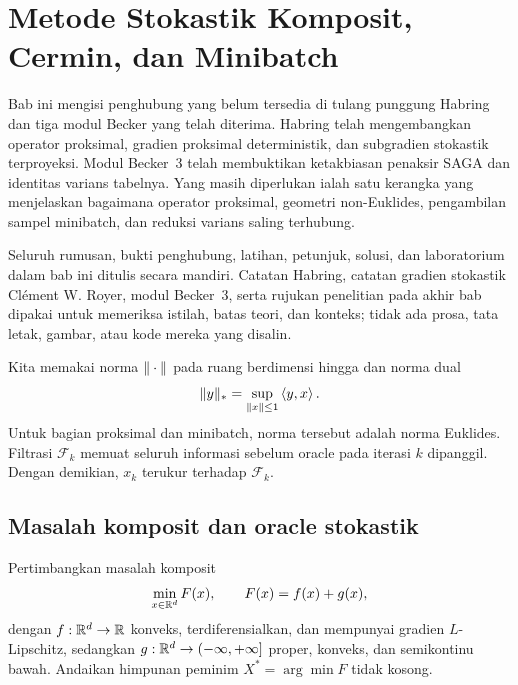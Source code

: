 \chapter{Metode Stokastik Komposit, Cermin, dan Minibatch}
\label{orig01:chapter:stochastic-composite}

Bab ini mengisi penghubung yang belum tersedia di tulang punggung Habring
dan tiga modul Becker yang telah diterima. Habring telah mengembangkan
operator proksimal, gradien proksimal deterministik, dan subgradien stokastik
terproyeksi. Modul Becker~3 telah membuktikan ketakbiasan penaksir SAGA dan
identitas varians tabelnya. Yang masih diperlukan ialah satu kerangka yang
menjelaskan bagaimana operator proksimal, geometri non-Euklides, pengambilan
sampel minibatch, dan reduksi varians saling terhubung.

Seluruh rumusan, bukti penghubung, latihan, petunjuk, solusi, dan laboratorium
dalam bab ini ditulis secara mandiri. Catatan Habring, catatan gradien
stokastik Cl\'ement W. Royer, modul Becker~3, serta rujukan penelitian pada
akhir bab dipakai untuk memeriksa istilah, batas teori, dan konteks; tidak ada
prosa, tata letak, gambar, atau kode mereka yang disalin.

Kita memakai norma $\|\cdot\|$ pada ruang berdimensi hingga dan norma
dual
\begin{equation}
  \|y\|_*=\sup_{\|x\|\leq1}\left\langle y , x\right\rangle.
\end{equation}
Untuk bagian proksimal dan minibatch, norma tersebut adalah norma Euklides.
Filtrasi $\mathcal F_k$ memuat seluruh informasi sebelum oracle pada iterasi
$k$ dipanggil. Dengan demikian, $x_k$ terukur terhadap $\mathcal F_k$.

\section{Masalah komposit dan oracle stokastik}
\label{orig01:section:model}

Pertimbangkan masalah komposit
\begin{equation}
  \label{orig01:eq:composite-problem}
  \min_{x\in\mathbb{R}^d} F(x),
  \qquad F(x)=f(x)+g(x),
\end{equation}
dengan $f:\mathbb{R}^d\to\mathbb{R}$ konveks, terdiferensialkan, dan mempunyai gradien
$L$-Lipschitz, sedangkan $g:\mathbb{R}^d\to(-\infty,+\infty]$ proper, konveks, dan
semikontinu bawah. Andaikan himpunan peminim $X^*=\arg\min F$ tidak kosong.

